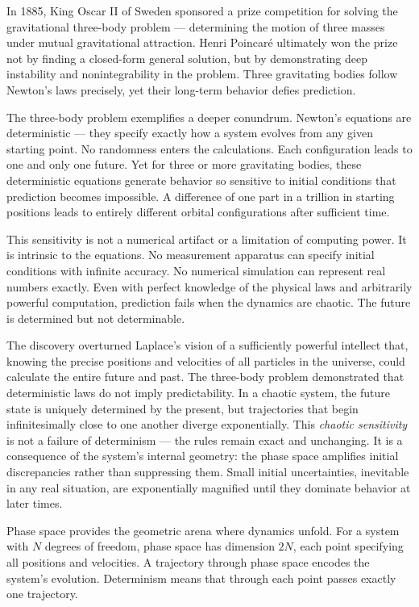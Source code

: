 In 1885, King Oscar II of Sweden sponsored a prize competition for solving the gravitational three-body problem — determining the motion of three masses under mutual gravitational attraction. Henri Poincaré ultimately won the prize not by finding a closed-form general solution, but by demonstrating deep instability and nonintegrability in the problem. Three gravitating bodies follow Newton's laws precisely, yet their long-term behavior defies prediction.

The three-body problem exemplifies a deeper conundrum. Newton's equations are deterministic — they specify exactly how a system evolves from any given starting point. No randomness enters the calculations. Each configuration leads to one and only one future. Yet for three or more gravitating bodies, these deterministic equations generate behavior so sensitive to initial conditions that prediction becomes impossible. A difference of one part in a trillion in starting positions leads to entirely different orbital configurations after sufficient time.

This sensitivity is not a numerical artifact or a limitation of computing power. It is intrinsic to the equations. No measurement apparatus can specify initial conditions with infinite accuracy. No numerical simulation can represent real numbers exactly. Even with perfect knowledge of the physical laws and arbitrarily powerful computation, prediction fails when the dynamics are chaotic. The future is determined but not determinable.

The discovery overturned Laplace's vision of a sufficiently powerful intellect that, knowing the precise positions and velocities of all particles in the universe, could calculate the entire future and past. The three-body problem demonstrated that deterministic laws do not imply predictability. In a chaotic system, the future state is uniquely determined by the present, but trajectories that begin infinitesimally close to one another diverge exponentially. This \emph{chaotic sensitivity} is not a failure of determinism — the rules remain exact and unchanging. It is a consequence of the system's internal geometry: the phase space amplifies initial discrepancies rather than suppressing them. Small initial uncertainties, inevitable in any real situation, are exponentially magnified until they dominate behavior at later times.

Phase space provides the geometric arena where dynamics unfold. For a system with $N$ degrees of freedom, phase space has dimension $2N$, each point specifying all positions and velocities. A trajectory through phase space encodes the system's evolution. Determinism means that through each point passes exactly one trajectory.

